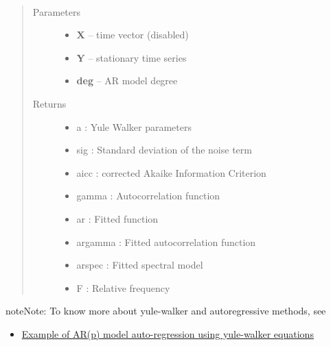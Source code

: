 \documentclass[letterpaper,10pt,english]{sphinxmanual}
\begin{document}
\begin{fulllineitems}
\label{altimetry.tools.spectrum:altimetry.tools.spectrum.yule_walker_regression}~\begin{quote}\begin{description}
\item[{Parameters}] \leavevmode\begin{itemize}
\item {} 
\textbf{X} -- time vector (disabled)

\item {} 
\textbf{Y} -- stationary time series

\item {} 
\textbf{deg} -- AR model degree

\end{itemize}

\item[{Returns}] \leavevmode
\begin{itemize}
\item {} 
a : Yule Walker parameters

\item {} 
sig : Standard deviation of the noise term

\item {} 
aicc : corrected Akaike Information Criterion

\item {} 
gamma : Autocorrelation function

\item {} 
ar : Fitted function

\item {} 
argamma : Fitted autocorrelation function

\item {} 
arspec : Fitted spectral model

\item {} 
F : Relative frequency

\end{itemize}


\end{description}\end{quote}

\begin{notice}{note}{Note:}
To know more about yule-walker and autoregressive methods, see
\begin{itemize}
\item {} 
\href{http://www-ssc.igpp.ucla.edu/personnel/russell/ESS265/Ch9/autoreg/node7.html}{Example of AR(p) model auto-regression using yule-walker equations}


\end{itemize}
\end{notice}
\end{fulllineitems}
\end{document}
